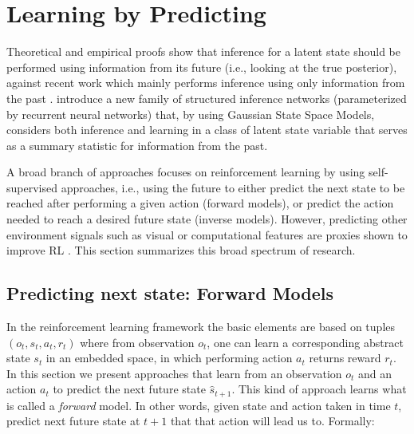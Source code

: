 \documentclass[a4paper]{article}
\begin{document}
\section{Learning by Predicting}
\label{LearningByPredicting}
Theoretical and empirical proofs show that inference for a latent state should be performed using information from its future (i.e., looking at the true posterior), against recent work which mainly performs inference using only information from the past \cite{Chung15,Krishnan17}. \cite{Krishnan17} introduce a new family of structured inference networks (parameterized by recurrent neural networks) that, by using Gaussian State Space Models, considers both inference and learning in a class of latent state variable that serves as a summary statistic for information from the past.

A broad branch of approaches focuses on reinforcement learning by using self-supervised approaches, i.e., using the future to either predict the next state to be reached after performing a given action (forward models), or predict the action needed to reach a desired future state (inverse models). However, predicting other environment signals such as visual or computational features are proxies shown to improve RL \cite{Jaderberg16}. This section summarizes this broad spectrum of research.


\subsection{Predicting next state: Forward Models }
\label{subsec:forward}
In the reinforcement learning framework the basic elements are based on tuples $(o_t, s_t, a_t, r_t)$ where from observation $o_t$, one can learn a corresponding abstract state $s_t$ in an embedded space, in which performing action $a_t$ returns reward $r_t$.
In this section we present approaches that learn from an observation $o_t$ and an action $a_t$ to predict the next future state $\hat{s}_{t+1}$. This kind of approach learns what is called a \textit{forward} model. In other words, given state and action taken in time $t$, predict next future state at $t+1$ that that action will lead us to. Formally: 
\end{document}
